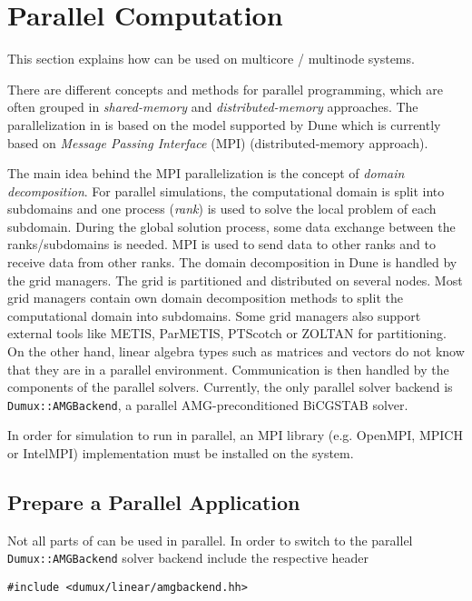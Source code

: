 \section{Parallel Computation}
\label{sec:parallelcomputation}
This section explains how \Dumux can be used
on multicore / multinode systems.

There are different concepts and methods for parallel programming, which are
often grouped in \textit{shared-memory} and \textit{distributed-memory}
approaches. The parallelization in \Dumux is based on the model supported by Dune which is currently based on
\textit{Message Passing Interface} (MPI) (distributed-memory approach).

The main idea behind the MPI parallelization is the concept of \textit{domain
decomposition}. For parallel simulations, the computational domain is split into
subdomains and one process (\textit{rank}) is used to solve the local problem of each
subdomain. During the global solution process, some data exchange between the
ranks/subdomains is needed. MPI is used to send data to other ranks and to receive
data from other ranks. The domain decomposition in Dune is handled by the grid managers.
The grid is partitioned and distributed on several nodes. Most grid managers contain own domain decomposition methods to split the
computational domain  into subdomains. Some grid managers also support external
tools like METIS, ParMETIS, PTScotch or ZOLTAN for partitioning.
On the other hand, linear algebra types such as matrices and vectors
do not know that they are in a parallel environment. Communication is then handled by the components of the
parallel solvers. Currently, the only parallel solver backend is \texttt{Dumux::AMGBackend}, a parallel AMG-preconditioned
BiCGSTAB solver.

In order for \Dumux simulation to run in parallel, an
MPI library (e.g. OpenMPI, MPICH or IntelMPI) implementation
must be installed on the system.

\subsection{Prepare a Parallel Application}
Not all parts of \Dumux can be used in parallel. In order to switch to the parallel \texttt{Dumux::AMGBackend}
solver backend include the respective header

\begin{lstlisting}[style=DumuxCode]
#include <dumux/linear/amgbackend.hh>
\end{lstlisting}

